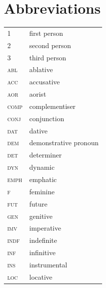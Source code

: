 \documentclass[output=paper,colorlinks,citecolor=brown]{langscibook}
\begin{document}
	
	
	
	
	

	
	\section*{Abbreviations}
	\begin{tabularx}{.5\textwidth}{@{}lQ@{}}
		\textsc{1} & first person\\
		\textsc{2} & second person\\
		\textsc{3} & third person\\
		\textsc{abl} & ablative\\
		\textsc{acc} & accusative\\
		\textsc{aor} & aorist \\
		\textsc{comp} & complementiser\\
		\textsc{conj} & conjunction\\
		\textsc{dat} & dative\\
		\textsc{dem} & demonstrative pronoun\\
		\textsc{det} & determiner\\
		\textsc{dyn} & dynamic\\
		\textsc{emph} & emphatic\\
		\textsc{f} & feminine\\
		\textsc{fut} & future\\
		\textsc{gen} & genitive\\
		\textsc{imv} & imperative\\
		\textsc{indf} & indefinite\\
		\textsc{inf} & infinitive\\
		\textsc{ins} & instrumental\\
		\textsc{loc} & locative\\
		
	\end{tabularx}%
\end{document}
